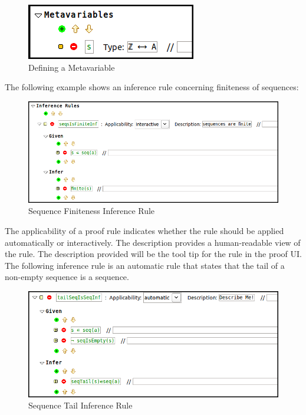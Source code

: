 \begin{center}
\begin{figure}
\label{metavarEx}
\includegraphics{images/Metavar.png}
\caption{Defining a Metavariable}
\end{figure}
\end{center}

\par 
The following example shows an inference rule concerning finiteness of sequences:

\begin{center}
\begin{figure}
\label{infEx}
\includegraphics{images/Inference.png}
\caption{Sequence Finiteness Inference Rule}
\end{figure}
\end{center}

\par 
The applicability of a proof rule indicates whether the rule should be applied automatically or interactively. The description provides a human-readable view of the rule. The description provided will be the tool tip for the rule in the proof UI. The following inference rule is an automatic rule that states that the tail of a non-empty sequence is a sequence.

\begin{center}
\begin{figure}
\label{infTEx}
\includegraphics{images/TailInference.png}
\caption{Sequence Tail Inference Rule}
\end{figure}
\end{center}